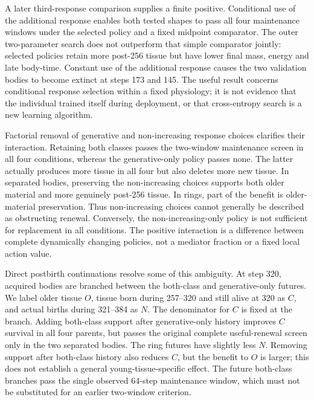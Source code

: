 A later third-response comparison supplies a finite positive. Conditional use of the additional response enables both tested shapes to pass all four maintenance windows under the selected policy and a fixed midpoint comparator. The outer two-parameter search does not outperform that simple comparator jointly: selected policies retain more post-256 tissue but have lower final mass, energy and late body-time. Constant use of the additional response causes the two validation bodies to become extinct at steps 173 and 145. The useful result concerns conditional response selection within a fixed physiology; it is not evidence that the individual trained itself during deployment, or that cross-entropy search is a new learning algorithm.

Factorial removal of generative and non-increasing response choices clarifies their interaction. Retaining both classes passes the two-window maintenance screen in all four conditions, whereas the generative-only policy passes none. The latter actually produces more tissue in all four but also deletes more new tissue. In separated bodies, preserving the non-increasing choices supports both older material and more genuinely post-256 tissue. In rings, part of the benefit is older-material preservation. Thus non-increasing choices cannot generally be described as obstructing renewal. Conversely, the non-increasing-only policy is not sufficient for replacement in all conditions. The positive interaction is a difference between complete dynamically changing policies, not a mediator fraction or a fixed local action value.

Direct postbirth continuations resolve some of this ambiguity. At step 320, acquired bodies are branched between the both-class and generative-only futures. We label older tissue $O$, tissue born during 257--320 and still alive at 320 as $C$, and actual births during 321--384 as $N$. The denominator for $C$ is fixed at the branch. Adding both-class support after generative-only history improves $C$ survival in all four parents, but passes the original complete useful-renewal screen only in the two separated bodies. The ring futures have slightly less $N$. Removing support after both-class history also reduces $C$, but the benefit to $O$ is larger; this does not establish a general young-tissue-specific effect. The future both-class branches pass the single observed 64-step maintenance window, which must not be substituted for an earlier two-window criterion.

